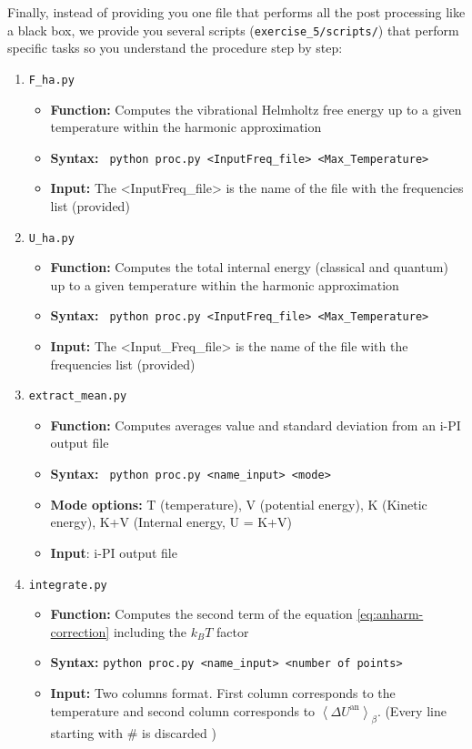 \documentclass[a4paper,11pt]{scrartcl}
\begin{document}
Finally, instead of providing you one file that performs all the post processing like a black box,
we provide you several scripts ({\texttt{exercise\_5/scripts/}}) that perform specific tasks so you understand the procedure step by step:
\begin{enumerate}



\item { \texttt{F\_ha.py} }
  \begin{itemize}
    \item{ \textbf{Function:} Computes the vibrational Helmholtz free energy up to a given temperature within the harmonic approximation}
    \item{ \textbf{Syntax:} \texttt{ python proc.py <InputFreq\_file> <Max\_Temperature>} }
    \item{ \textbf{Input:} The <InputFreq\_file> is the name of the file with the frequencies list (provided) }
  \end{itemize} 


\item { \texttt{U\_ha.py} }
  \begin{itemize}
    \item{ \textbf{Function:} Computes the total internal energy (classical and quantum) up to a given temperature within the harmonic approximation}
    \item{ \textbf{Syntax:} \texttt{ python proc.py <Input\-Freq\_file> <Max\_Temperature>} }
    \item{ \textbf{Input:} The <Input\_Freq\_file> is the name of the file with the frequencies list (provided) }
  \end{itemize} 


\item {\texttt{extract\_mean.py}}
  \begin{itemize}
    \item{ \textbf{Function:} Computes averages value and standard deviation from an i-PI output file }
    \item{ \textbf{Syntax:} \texttt{ python proc.py <name\_input>  <mode>} }
    \item{ \textbf{Mode options:} T (temperature), V (potential energy), K (Kinetic energy), K+V (Internal energy, U = K+V) }
    \item{ \textbf{Input}: i-PI output file }
  \end{itemize}
  
\item {\texttt{integrate.py}}
  \begin{itemize}
    \item{\textbf{Function:} Computes the second term of the equation \ref{eq:anharm-correction} including the $k_B T$ factor }
    \item{\textbf{Syntax:} \texttt{python proc.py <name\_input>  <number of points>} }
    \item{\textbf{Input:} Two columns format. First column corresponds to the temperature and second column corresponds to $\left\langle \Delta U^{\text{an}} \right\rangle_{\beta}$. (Every line starting with \# is discarded )}
  \end{itemize}  

\end{enumerate}
\end{document}
